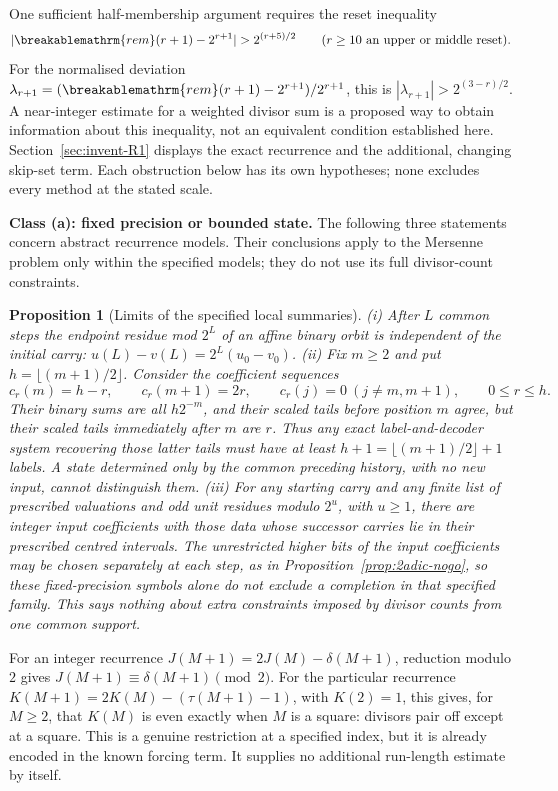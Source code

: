 \documentclass[11pt]{article}
\theoremstyle{plain}
\newtheorem{prop}[thm]{Proposition}
\theoremstyle{definition}
\theoremstyle{remark}
\renewcommand{\mathrm}[1]{\ifmmode\breakablemathrm{#1}\else\textrm{#1}\fi}%
\begin{document}
One sufficient half-membership argument requires the reset inequality
\[
 |\mathrm{rem}(r+1)-2^{r+1}|>2^{(r+5)/2}
 \qquad(r\ge10\text{ an upper or middle reset}).
\]
For the normalised deviation
$\lambda_{r+1}=(\mathrm{rem}(r+1)-2^{r+1})/2^{r+1}$, this is
$|\lambda_{r+1}|>2^{(3-r)/2}$.  A near-integer estimate for a
weighted divisor sum is a proposed way to obtain information about
this inequality, not an equivalent condition established here.
Section~\ref{sec:invent-R1} displays the exact recurrence and the
additional, changing skip-set term.  Each obstruction below has its
own hypotheses; none excludes every method at the stated scale.

\textbf{Class (a): fixed precision or bounded state.} The following
three statements concern abstract recurrence models.  Their
conclusions apply to the Mersenne problem only within the specified
models; they do not use its full divisor-count constraints.

\begin{prop}[Limits of the specified local summaries]
\label{prop:local-void}
(i) After $L$ common steps the endpoint residue mod $2^L$ of an affine binary orbit is
\emph{independent} of the initial carry: $u(L) - v(L) = 2^L(u_0 - v_0)$.
(ii) Fix $m\ge2$ and put $h=\lfloor(m+1)/2\rfloor$.  Consider the
coefficient sequences
\[
 c_r(m)=h-r,\qquad c_r(m+1)=2r,\qquad
 c_r(j)=0\ (j\ne m,m+1),\qquad 0\le r\le h.
\]
Their binary sums are all $h2^{-m}$, and their scaled tails before
position $m$ agree, but their scaled tails immediately after $m$ are
$r$.  Thus any exact label-and-decoder system recovering those latter
tails must have at least $h+1=\lfloor(m+1)/2\rfloor+1$ labels.  A state
determined only by the common preceding history, with no new input,
cannot distinguish them. (iii) For any
starting carry and any finite list of prescribed valuations and
odd unit residues modulo $2^u$, with $u\ge1$, there are integer input
coefficients with those data whose successor carries lie in their
prescribed centred intervals.  The unrestricted higher bits of the
input coefficients may be chosen separately at each step, as in
Proposition~\ref{prop:2adic-nogo}, so these fixed-precision symbols alone do not exclude a completion in
that specified family.  This says nothing about extra constraints imposed
by divisor counts from one common support.
\end{prop}

For an integer recurrence $J(M+1)=2J(M)-\delta(M+1)$,
reduction modulo $2$ gives $J(M+1)\equiv\delta(M+1)\pmod2$.
For the particular recurrence $K(M+1)=2K(M)-(\tau(M+1)-1)$,
with $K(2)=1$, this gives, for $M\ge2$, that $K(M)$ is even
exactly when $M$ is a square: divisors pair off except at a square.
This is a genuine restriction at a specified index, but it is already
encoded in the known forcing term.  It supplies no additional
run-length estimate by itself.
\end{document}
